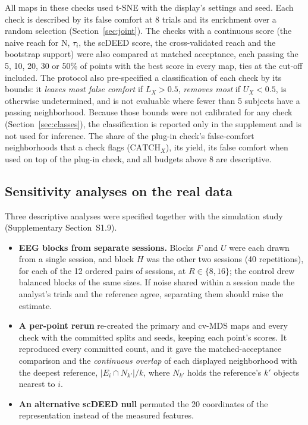 \documentclass[11pt]{article}
\begin{document}
All maps in these checks used t-SNE with the display's settings and seed.
Each check is described by its false comfort at 8 trials and its enrichment over a random selection (Section~\ref{sec:joint}).
The checks with a continuous score (the naive reach for N, $\tau_i$, the scDEED score, the cross-validated reach and the bootstrap support) were also compared at matched acceptance, each passing the 5, 10, 20, 30 or 50\% of points with the best score in every map, ties at the cut-off included.
The protocol also pre-specified a classification of each check by its bounds: it \emph{leaves most false comfort} if $L_X>0.5$, \emph{removes most} if $U_X<0.5$, is otherwise undetermined, and is not evaluable where fewer than 5 subjects have a passing neighborhood.
Because those bounds were not calibrated for any check (Section~\ref{sec:classes}), the classification is reported only in the supplement and is not used for inference.
The share of the plug-in check's false-comfort neighborhoods that a check flags ($\mathrm{CATCH}_X$), its yield, its false comfort when used on top of the plug-in check, and all budgets above 8 are descriptive.

\subsection{Sensitivity analyses on the real data}\label{sec:sens}

Three descriptive analyses were specified together with the simulation study (Supplementary Section~S1.9).
\begin{itemize}[leftmargin=*]
  \item \textbf{EEG blocks from separate sessions.} Blocks $F$ and $U$ were each drawn from a single session, and block $H$ was the other two sessions (40 repetitions), for each of the 12 ordered pairs of sessions, at $R\in\{8,16\}$; the control drew balanced blocks of the same sizes.
  If noise shared within a session made the analyst's trials and the reference agree, separating them should raise the estimate.
  \item \textbf{A per-point rerun} re-created the primary and cv-MDS maps and every check with the committed splits and seeds, keeping each point's scores.
  It reproduced every committed count, and it gave the matched-acceptance comparison and the \emph{continuous overlap} of each displayed neighborhood with the deepest reference, $|E_i\cap N_{k'}|/k$, where $N_{k'}$ holds the reference's $k'$ objects nearest to $i$.
  \item \textbf{An alternative scDEED null} permuted the 20 coordinates of the representation instead of the measured features.
\end{itemize}
\end{document}
